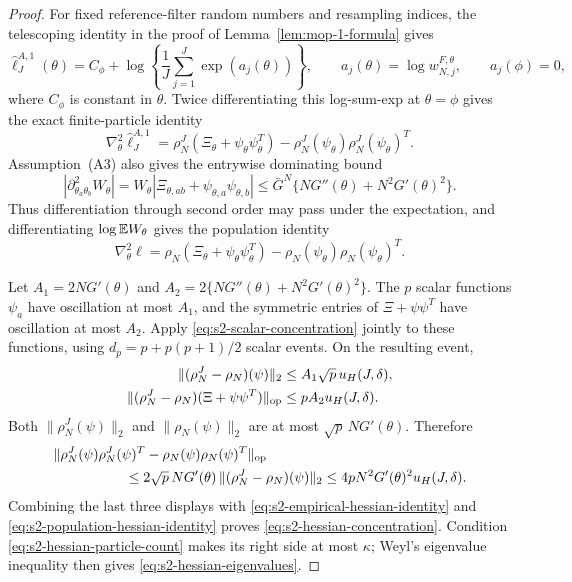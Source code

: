 \documentclass[11pt]{article}
\newcommand\refAssumpBoundedMeasurement{(A3)} %
\theoremstyle{thmstylethree}%
\begin{document}
\begin{proof}
For fixed reference-filter random numbers and resampling indices, the
telescoping identity in the proof of Lemma~\ref{lem:mop-1-formula} gives
\begin{equation*}
\hat\ell_J^{A,1}(\theta)
=C_\phi+\log\left\{\frac1J\sum_{j=1}^J\exp(a_j(\theta))\right\},
\qquad a_j(\theta)=\log w_{N,j}^{F,\theta},\qquad a_j(\phi)=0,
\end{equation*}
where $C_\phi$ is constant in $\theta$.  Twice differentiating this log-sum-exp at
$\theta=\phi$ gives the exact finite-particle identity
\begin{equation}
\nabla_\theta^2\hat\ell_J^{A,1}
=\rho_N^J(\Xi_\theta+\psi_\theta\psi_\theta^T)
 -\rho_N^J(\psi_\theta)\rho_N^J(\psi_\theta)^T.                \label{eq:s2-empirical-hessian-identity}
\end{equation}
Assumption~{\refAssumpBoundedMeasurement} also gives the entrywise dominating
bound
\begin{equation*}
|\partial_{\theta_a\theta_b}^2W_\theta|
=W_\theta|\Xi_{\theta,ab}+\psi_{\theta,a}\psi_{\theta,b}|
\leq\bar G^N\{NG''(\theta)+N^2G'(\theta)^2\}.
\end{equation*}
Thus differentiation through second order may pass under the expectation, and
differentiating $\log\mathbb{E} W_\theta$ gives the population identity
\begin{equation}
\nabla_\theta^2\ell
=\rho_N(\Xi_\theta+\psi_\theta\psi_\theta^T)
 -\rho_N(\psi_\theta)\rho_N(\psi_\theta)^T.                   \label{eq:s2-population-hessian-identity}
\end{equation}

Let $A_1=2NG'(\theta)$ and
$A_2=2\{NG''(\theta)+N^2G'(\theta)^2\}$.  The $p$ scalar functions
$\psi_a$ have oscillation at most $A_1$, and the symmetric entries of
$\Xi+\psi\psi^T$ have oscillation at most $A_2$.  Apply
\eqref{eq:s2-scalar-concentration} jointly to these functions, using
$d_p=p+p(p+1)/2$ scalar events.  On the resulting event,
\begin{align*}
\|(\rho_N^J-\rho_N)(\psi)\|_2
 &\leq A_1\sqrt p\,u_H(J,\delta),\\
\|(\rho_N^J-\rho_N)(\Xi+\psi\psi^T)\|_{\rm op}
 &\leq pA_2u_H(J,\delta).
\end{align*}
Both $\|\rho_N^J(\psi)\|_2$ and $\|\rho_N(\psi)\|_2$ are at most
$\sqrt p\,N G'(\theta)$.  Therefore
\begin{align*}
&\|\rho_N^J(\psi)\rho_N^J(\psi)^T
       -\rho_N(\psi)\rho_N(\psi)^T\|_{\rm op}\\
&\hspace{18mm}\leq
2\sqrt p\,N G'(\theta)\,
 \|(\rho_N^J-\rho_N)(\psi)\|_2
\leq4pN^2G'(\theta)^2u_H(J,\delta).
\end{align*}
Combining the last three displays with
\eqref{eq:s2-empirical-hessian-identity} and
\eqref{eq:s2-population-hessian-identity} proves
\eqref{eq:s2-hessian-concentration}.  Condition
\eqref{eq:s2-hessian-particle-count} makes its right side at most $\kappa$;
Weyl's eigenvalue inequality then gives
\eqref{eq:s2-hessian-eigenvalues}.
\end{proof}
\end{document}
